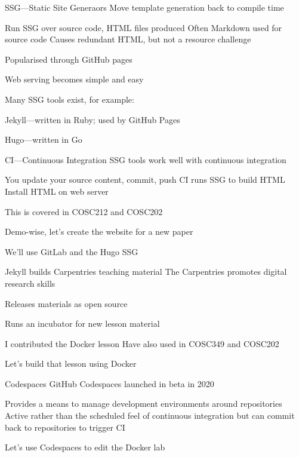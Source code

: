 \documentclass[aspectratio=169,t]{beamer}
\begin{document}
\begin{dframe}{SSG---Static Site Generaors}
  \1 Move template generation back to compile time

  \2 Run SSG over source code, HTML files produced
  \2 Often Markdown used for source code
  \2 Causes redundant HTML, but not a resource challenge

  \1 Popularised through GitHub pages

  \2 Web serving becomes simple and easy


  \1 Many SSG tools exist, for example:

  \2 Jekyll---written in Ruby; used by GitHub Pages

  \2 Hugo---written in Go
\end{dframe}

\begin{dframe}{CI---Continuous Integration}
  \1 SSG tools work well with continuous integration

  \2 You update your source content, commit, push
  \2 CI runs SSG to build HTML
  \2 Install HTML on web server

  \bigskip
  
  \1 This is covered in COSC212 and COSC202
  
  \bigskip

  \1 Demo-wise, let's create the website for a new paper
  
  \2 We'll use GitLab and the Hugo SSG
\end{dframe}

\begin{dframe}{Jekyll builds Carpentries teaching material}
  \1 The Carpentries promotes digital research skills

  \2 Releases materials as open source

  \bigskip
  
  \1 Runs an incubator for new lesson material
  
  \2 I contributed the Docker lesson
  \2 Have also used in COSC349 and COSC202
  
  \bigskip

  \1 Let's build that lesson using Docker
\end{dframe}

\begin{dframe}{Codespaces}
  \1 GitHub Codespaces launched in beta in 2020 %

  \2 Provides a means to manage development environments around repositories
  \2 Active rather than the scheduled feel of continuous integration
  \2 but can commit back to repositories to trigger CI

  \bigskip

  \1 Let's use Codespaces to edit the Docker lab
\end{dframe}
\end{document}
